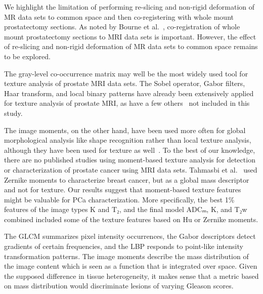 \documentclass[10pt,letterpaper]{article}
\newcommand{\citep}{\cite}
\begin{document}
We highlight the limitation of performing re-slicing and
non-rigid deformation of MR data sets to common space and then co-registering
with whole mount prostatectomy sections. As noted by Bourne et
al.\ \cite{Bourne2017}, co-registration of whole mount prostatectomy sections to
MRI data sets is important. However, the effect of re-slicing and non-rigid
deformation of MR data sets to common space remains to be explored.

The gray-level co-occurrence matrix may well be the most widely used tool for
texture analysis of prostate MRI data sets. The Sobel operator, Gabor filters,
Haar transform, and local binary patterns have already been extensively applied
for texture analysis of prostate MRI, as have a few others~\citep{Lemaitre2015}
not included in this study.

The image moments, on the other hand, have been used more often for global
morphological analysis like shape recognition rather than local texture
analysis, although they have been used for texture as well~\citep{Tuceryan1994,
Laws1980, Tuceryan1990}. To the best of our knowledge, there are no published
studies using moment-based texture analysis for detection or characterization of
prostate cancer using MRI data sets. Tahmasbi et al.\ \cite{Tahmasbi2011} used
Zernike moments to characterize breast cancer, but as a global mass descriptor
and not for texture. Our results suggest that moment-based texture features
might be valuable for PCa characterization. More specifically, the best 1\%
features of the image types K and T₂, and the final model ADCₘ, K, and T₂w
combined included some of the texture features based on Hu or Zernike moments.

The GLCM summarizes pixel intensity occurrences, the Gabor descriptors detect
gradients of certain frequencies, and the LBP responds to point-like intensity
transformation patterns. The image moments describe the mass distribution of the
image content which is seen as a function that is integrated over space. Given
the supposed difference in tissue heterogeneity, it makes sense that a metric
based on mass distribution would discriminate lesions of varying Gleason scores.
\end{document}
